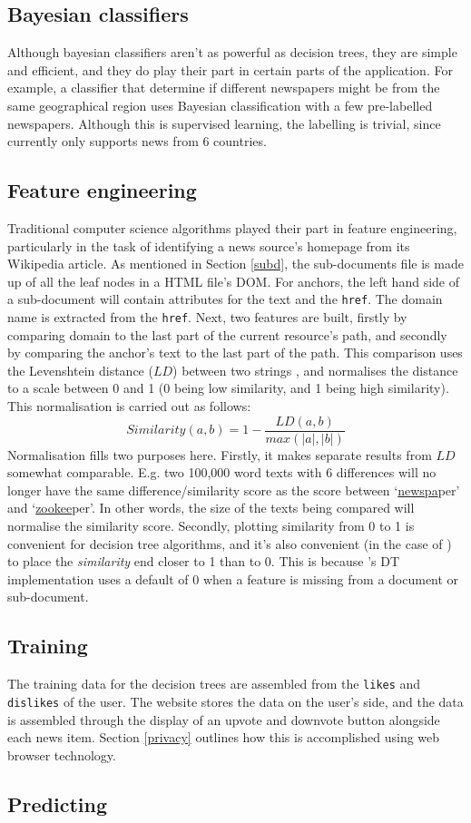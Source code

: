 \subsection{Bayesian classifiers}
Although bayesian classifiers aren't as powerful as decision trees,
they are simple and efficient, and they do play their part in certain
parts of the \nr{} application.  For example, a classifier that determine
if different newspapers might be from the same geographical region
uses Bayesian classification with a few pre-labelled newspapers.  Although
this is supervised learning, the labelling is trivial, since \nr{}
currently only supports news from 6 countries.
\subsection{Feature engineering}
Traditional computer science algorithms played their part in feature
engineering, particularly in the task of identifying a news source's
homepage from its Wikipedia article.  As mentioned in Section \ref{subd},
the sub-documents file is made up of all the leaf nodes in a HTML file's
DOM.  For anchors, the left hand side of a sub-document will contain
attributes for the text and the {\tt href}.  The domain name is extracted
from the {\tt href}.  Next, two features are built, firstly by comparing
domain to the last part of the current resource's path, and secondly by comparing the
anchor's text to the last part of the path.  This comparison uses
the Levenshtein distance ($LD$) between two strings \cite{levenshtein1966},
and normalises
the distance to a scale between 0 and 1 (0 being low similarity, and
1 being high similarity).  This normalisation is carried out as follows:
\begin{equation}
    Similarity(a, b) = 1 - \frac{LD(a, b)}{max(|a|, |b|)}
\end{equation}
Normalisation fills two purposes here.  Firstly, it makes
separate results from $LD$ somewhat comparable.  E.g.
two 100,000 word texts with 6 differences will no longer have the same
difference/similarity score as the score between `\underline{newspa}per' and
`\underline{zookee}per'.  In other words, the size of the texts being compared will
normalise the similarity score.  Secondly, plotting similarity from
0 to 1 is convenient for decision tree algorithms, and it's also convenient
(in the case of \nr{}) to place the {\it similarity} end closer to 1 than to 0.
This is because \nr{}'s DT implementation uses a default of 0 when a feature
is missing from a document or sub-document.

\subsection{Training\label{training}}
The training data for the decision trees are
assembled from the {\tt likes} and {\tt dislikes} of the user.
The \nr{} website stores the data on the user's side, and the
data is assembled through the display of an upvote
and downvote button alongside each news item.
Section \ref{privacy} outlines how this is accomplished using
web browser technology.
\subsection{Predicting\label{predicting}}